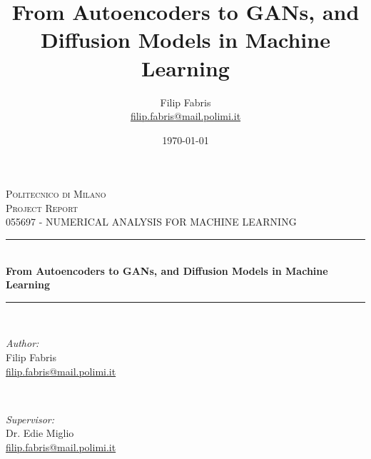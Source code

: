 \documentclass{article}
\title{From Autoencoders to GANs, and Diffusion Models in Machine Learning}
\author{Filip Fabris \\ \href{mailto:filip.fabris@mail.polimi.it}{filip.fabris@mail.polimi.it}}
\date{\today}
\begin{document}
\begin{titlepage} %
\newcommand{\HRule}{\rule{\linewidth}{0.5mm}} %

\center %

\textsc{\LARGE Politecnico di Milano}\\[1.5cm] %
\textsc{\Large Project Report}\\[0.5cm] %
\textsc{\large 055697 - NUMERICAL ANALYSIS FOR MACHINE LEARNING}\\[0.5cm] %

\HRule \\[0.4cm]
{ \huge \bfseries From Autoencoders to GANs, and Diffusion Models in Machine Learning}\\[0.4cm] %
\HRule \\[1.5cm]
 
\begin{minipage}{0.4\textwidth}
\begin{flushleft} \large
\emph{Author:}\\
Filip Fabris %
\\ \href{mailto:filip.fabris@mail.polimi.it}{filip.fabris@mail.polimi.it} %
\end{flushleft}
\end{minipage}
~
\begin{minipage}{0.4\textwidth}
\begin{flushright} \large
\emph{Supervisor:} \\
Dr. Edie Miglio %
\\ \href{mailto:edie.miglio@polimi.it}{filip.fabris@mail.polimi.it} %
\end{flushright}
\end{minipage}\\[2cm]


\end{titlepage}
\end{document}
